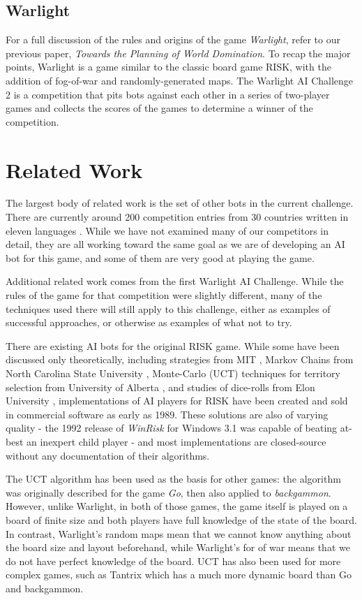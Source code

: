 \documentclass[a4paper,11pt]{article}
\begin{document}
\subsection{Warlight} \label{sec:warlight}
For a full discussion of the rules and origins of the game \emph{Warlight}, refer
to our previous paper, \emph{Towards the Planning of World Domination}\cite{ourproposal}.
To recap the major points, Warlight is a game similar to the classic board game RISK, with 
the addition of fog-of-war and randomly-generated maps. The Warlight AI Challenge 2 is a 
competition that pits bots against each other in a series of two-player games and collects 
the scores of the games to determine a winner of the competition.

\section{Related Work}\label{sec:previous}
The largest body of related work is the set of other bots in the current challenge.  
There are currently around 200 competition entries from 30 countries written in 
eleven languages \cite{warlight}.  While we have not examined many of our competitors 
in detail, they are all working toward the same goal as we are of developing an AI bot for 
this game, and some of them are very good at playing the game.

Additional related work comes from the first Warlight AI Challenge.  While the 
rules of the game for that competition were slightly different, many of the 
techniques used there will still apply to this challenge, either as examples of 
successful approaches, or otherwise as examples of what not to try.

There are existing AI bots for the original RISK game.  While some have been 
discussed only theoretically, including strategies from MIT \cite{riskmit}, Markov 
Chains from North Carolina State University \cite{riskncs}, Monte-Carlo (UCT) 
techniques for territory selection from University of Alberta \cite{riskalb}, and 
studies of dice-rolls from Elon University \cite{riskelon}, implementations of AI 
players for RISK have been created and sold in commercial software as early as 1989. 
These solutions are also of varying quality - the 1992 release of \textit{WinRisk} for 
Windows 3.1 was capable of beating at-best an inexpert child player - and most 
implementations are closed-source without any documentation of their algorithms.

The UCT algorithm has been used as the basis for other games: the algorithm was originally 
described for the game \emph{Go}\cite{uct}, then also applied to 
\emph{backgammon}\cite{uctback}.  However, unlike Warlight, in both of those games, the game 
itself is played on a board of finite size and both players have full knowledge of the state 
of the board.  In contrast, Warlight's random maps mean that we cannot know anything about 
the board size and layout beforehand, while Warlight's for of war means that we do not have 
perfect knowledge of the board. UCT has also been used for more complex games, such as 
Tantrix\cite{tantrix} which has a much more dynamic board than Go and backgammon.
\end{document}
